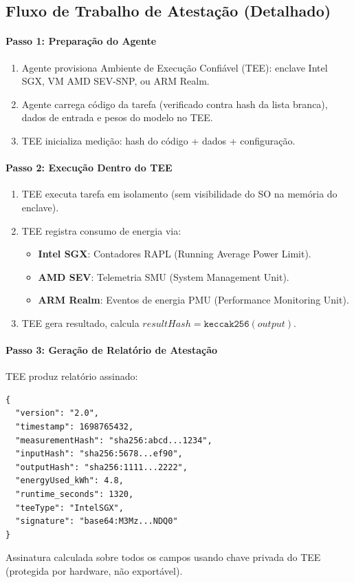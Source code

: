 \documentclass[11pt]{article}
\begin{document}
\begin{itemize}[noitemsep]
\begin{itemize}[noitemsep]
\begin{itemize}[noitemsep]
\subsection{Fluxo de Trabalho de Atestação (Detalhado)}
\label{sec:attestation-workflow}
\paragraph{Passo 1: Preparação do Agente}
\begin{enumerate}[noitemsep]
  \item Agente provisiona Ambiente de Execução Confiável (TEE): enclave Intel SGX, VM AMD SEV-SNP, ou ARM Realm.
  \item Agente carrega código da tarefa (verificado contra hash da lista branca), dados de entrada e pesos do modelo no TEE.
  \item TEE inicializa medição: hash do código + dados + configuração.
\end{enumerate}

\paragraph{Passo 2: Execução Dentro do TEE}
\begin{enumerate}[noitemsep]
  \item TEE executa tarefa em isolamento (sem visibilidade do SO na memória do enclave).
  \item TEE registra consumo de energia via:
    \begin{itemize}[noitemsep]
      \item \textbf{Intel SGX}: Contadores RAPL (Running Average Power Limit).
      \item \textbf{AMD SEV}: Telemetria SMU (System Management Unit).
      \item \textbf{ARM Realm}: Eventos de energia PMU (Performance Monitoring Unit).
    \end{itemize}
  \item TEE gera resultado, calcula $resultHash = \texttt{keccak256}(output)$.
\end{enumerate}

\paragraph{Passo 3: Geração de Relatório de Atestação}
TEE produz relatório assinado:
\begin{verbatim}
{
  "version": "2.0",
  "timestamp": 1698765432,
  "measurementHash": "sha256:abcd...1234",
  "inputHash": "sha256:5678...ef90",
  "outputHash": "sha256:1111...2222",
  "energyUsed_kWh": 4.8,
  "runtime_seconds": 1320,
  "teeType": "IntelSGX",
  "signature": "base64:M3Mz...NDQ0"
}
\end{verbatim}
Assinatura calculada sobre todos os campos usando chave privada do TEE (protegida por hardware, não exportável).


\end{itemize}
\end{itemize}
\end{itemize}
\end{document}
